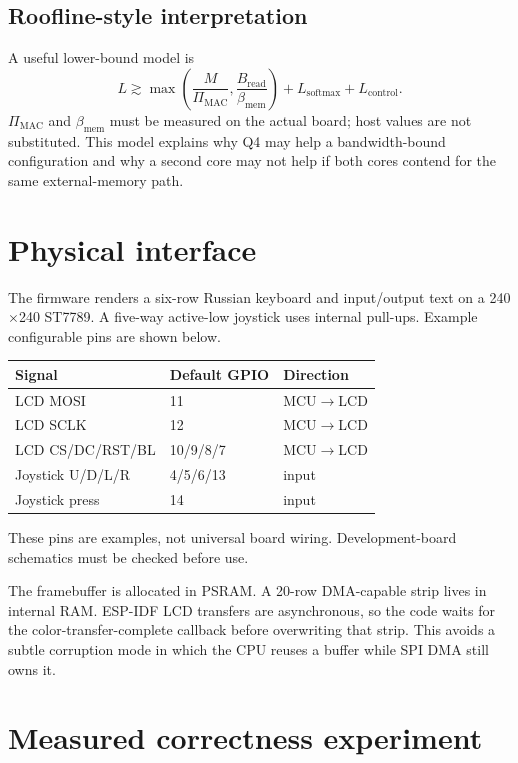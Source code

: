 \documentclass{article}
\begin{document}
\subsection{Roofline-style interpretation}
A useful lower-bound model is
\begin{equation}
L\gtrsim
\max\left(
\frac{M}{\Pi_{\mathrm{MAC}}},
\frac{B_{\mathrm{read}}}{\beta_{\mathrm{mem}}}
\right)
+L_{\mathrm{softmax}}+L_{\mathrm{control}}.
\end{equation}
$\Pi_{\mathrm{MAC}}$ and $\beta_{\mathrm{mem}}$ must be measured on the actual board; host values are not substituted. This model explains why Q4 may help a bandwidth-bound configuration and why a second core may not help if both cores contend for the same external-memory path.

\section{Physical interface}
The firmware renders a six-row Russian keyboard and input/output text on a 240$\times$240 ST7789. A five-way active-low joystick uses internal pull-ups. Example configurable pins are shown below.

\begin{table}[H]
\centering
\begin{tabular}{lll}
\toprule
Signal & Default GPIO & Direction\\
\midrule
LCD MOSI & 11 & MCU$\rightarrow$LCD\\
LCD SCLK & 12 & MCU$\rightarrow$LCD\\
LCD CS/DC/RST/BL & 10/9/8/7 & MCU$\rightarrow$LCD\\
Joystick U/D/L/R & 4/5/6/13 & input\\
Joystick press & 14 & input\\
\bottomrule
\end{tabular}
\end{table}
These pins are examples, not universal board wiring. Development-board schematics must be checked before use.

The framebuffer is allocated in PSRAM. A 20-row DMA-capable strip lives in internal RAM. ESP-IDF LCD transfers are asynchronous, so the code waits for the color-transfer-complete callback before overwriting that strip. This avoids a subtle corruption mode in which the CPU reuses a buffer while SPI DMA still owns it.

\section{Measured correctness experiment}
\end{document}
